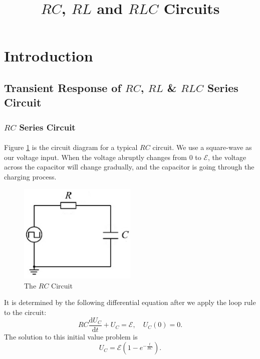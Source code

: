 \documentclass{my_template}
\title{$RC$, $RL$ and $RLC$ Circuits}
\begin{document}
    \maketitle
    \tableofcontents
    \newpage
    \section{Introduction}
    \subsection{Transient Response of $RC$, $RL$ \& $RLC$ Series Circuit}
    \subsubsection{$RC$ Series Circuit}
    \paragraph{} Figure \ref{fig:RC} is the circuit diagram for a typical $RC$ circuit. We use a square-wave as our voltage input. When the voltage abruptly changes from 0 to $\mathcal{E}$, the voltage across the capacitor will change gradually, and the capacitor is going through the charging process.
    \begin{figure}[H]
        \centering
        \includegraphics[width=0.5\textwidth]{fig/RC.png}
        \caption{The $RC$ Circuit}
        \label{fig:RC}
    \end{figure}
    It is determined by the following differential equation after we apply the loop rule to the circuit:
    \begin{equation}
        RC\frac{\mathrm{d}U_C}{\mathrm{d}t}+U_C=\mathcal{E},\quad U_C(0)=0.\label{eqn:RCcharging}
    \end{equation}
    The solution to this initial value problem is $$U_C=\mathcal{E}(1-e^{-\frac{t}{RC}}).$$
\end{document}
